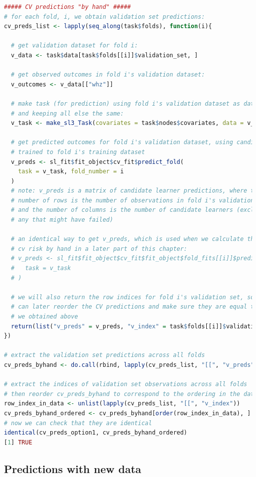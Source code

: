 \documentclass[
  12pt, krantz2,
]{krantz}
\newcommand{\1}{\mathbbm{1}}
\theoremstyle{definition}
\theoremstyle{definition}
\theoremstyle{definition}
\theoremstyle{definition}
\theoremstyle{remark}
\begin{document}
\begin{lstlisting}[language=R]
##### CV predictions "by hand" #####
# for each fold, i, we obtain validation set predictions:
cv_preds_list <- lapply(seq_along(task$folds), function(i){
  
  # get validation dataset for fold i:
  v_data <- task$data[task$folds[[i]]$validation_set, ]
  
  # get observed outcomes in fold i's validation dataset:
  v_outcomes <- v_data[["whz"]]

  # make task (for prediction) using fold i's validation dataset as data, 
  # and keeping all else the same:
  v_task <- make_sl3_Task(covariates = task$nodes$covariates, data = v_data)
  
  # get predicted outcomes for fold i's validation dataset, using candidates 
  # trained to fold i's training dataset
  v_preds <- sl_fit$fit_object$cv_fit$predict_fold(
    task = v_task, fold_number = i
  )
  # note: v_preds is a matrix of candidate learner predictions, where the 
  # number of rows is the number of observations in fold i's validation dataset 
  # and the number of columns is the number of candidate learners (excluding 
  # any that might have failed)
  
  # an identical way to get v_preds, which is used when we calculate the 
  # cv risk by hand in a later part of this chapter:
  # v_preds <- sl_fit$fit_object$cv_fit$fit_object$fold_fits[[i]]$predict(
  #   task = v_task
  # )
  
  # we will also return the row indices for fold i's validation set, so we 
  # can later reorder the CV predictions and make sure they are equal to what 
  # we obtained above
  return(list("v_preds" = v_preds, "v_index" = task$folds[[i]]$validation_set))
})

# extract the validation set predictions across all folds
cv_preds_byhand <- do.call(rbind, lapply(cv_preds_list, "[[", "v_preds"))

# extract the indices of validation set observations across all folds
# then reorder cv_preds_byhand to correspond to the ordering in the data
row_index_in_data <- unlist(lapply(cv_preds_list, "[[", "v_index"))
cv_preds_byhand_ordered <- cv_preds_byhand[order(row_index_in_data), ]
# now we can check that they are identical
identical(cv_preds_option1, cv_preds_byhand_ordered)
[1] TRUE
\end{lstlisting}

\hypertarget{predictions-with-new-data}{%
\subsection{Predictions with new data}\label{predictions-with-new-data}}
\end{document}
